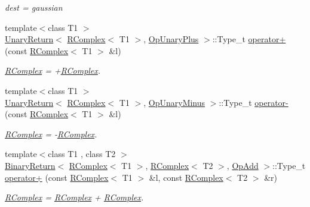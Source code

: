 \begin{DoxyCompactItemize}
\begin{DoxyCompactList}\small\item\em dest = gaussian \end{DoxyCompactList}\item 
{\footnotesize template$<$class T1 $>$ }\\\mbox{\hyperlink{structENSEM_1_1UnaryReturn}{Unary\+Return}}$<$ \mbox{\hyperlink{classENSEM_1_1RComplex}{R\+Complex}}$<$ T1 $>$, \mbox{\hyperlink{structENSEM_1_1OpUnaryPlus}{Op\+Unary\+Plus}} $>$\+::Type\+\_\+t \mbox{\hyperlink{group__rcomplex_ga7b4d2aabc48b7a45a328cf586ea8d5f0}{operator+}} (const \mbox{\hyperlink{classENSEM_1_1RComplex}{R\+Complex}}$<$ T1 $>$ \&l)
\begin{DoxyCompactList}\small\item\em \mbox{\hyperlink{classENSEM_1_1RComplex}{R\+Complex}} = +\mbox{\hyperlink{classENSEM_1_1RComplex}{R\+Complex}}. \end{DoxyCompactList}\item 
{\footnotesize template$<$class T1 $>$ }\\\mbox{\hyperlink{structENSEM_1_1UnaryReturn}{Unary\+Return}}$<$ \mbox{\hyperlink{classENSEM_1_1RComplex}{R\+Complex}}$<$ T1 $>$, \mbox{\hyperlink{structENSEM_1_1OpUnaryMinus}{Op\+Unary\+Minus}} $>$\+::Type\+\_\+t \mbox{\hyperlink{group__rcomplex_ga1b707b6c08424743d1f21d7162f4553b}{operator-\/}} (const \mbox{\hyperlink{classENSEM_1_1RComplex}{R\+Complex}}$<$ T1 $>$ \&l)
\begin{DoxyCompactList}\small\item\em \mbox{\hyperlink{classENSEM_1_1RComplex}{R\+Complex}} = -\/\mbox{\hyperlink{classENSEM_1_1RComplex}{R\+Complex}}. \end{DoxyCompactList}\item 
{\footnotesize template$<$class T1 , class T2 $>$ }\\\mbox{\hyperlink{structENSEM_1_1BinaryReturn}{Binary\+Return}}$<$ \mbox{\hyperlink{classENSEM_1_1RComplex}{R\+Complex}}$<$ T1 $>$, \mbox{\hyperlink{classENSEM_1_1RComplex}{R\+Complex}}$<$ T2 $>$, \mbox{\hyperlink{structENSEM_1_1OpAdd}{Op\+Add}} $>$\+::Type\+\_\+t \mbox{\hyperlink{group__rcomplex_ga4d7e8b93db619c9854c1e6fa23a3a454}{operator+}} (const \mbox{\hyperlink{classENSEM_1_1RComplex}{R\+Complex}}$<$ T1 $>$ \&l, const \mbox{\hyperlink{classENSEM_1_1RComplex}{R\+Complex}}$<$ T2 $>$ \&r)
\begin{DoxyCompactList}\small\item\em \mbox{\hyperlink{classENSEM_1_1RComplex}{R\+Complex}} = \mbox{\hyperlink{classENSEM_1_1RComplex}{R\+Complex}} + \mbox{\hyperlink{classENSEM_1_1RComplex}{R\+Complex}}. \end{DoxyCompactList}\item 

\end{DoxyCompactItemize}
